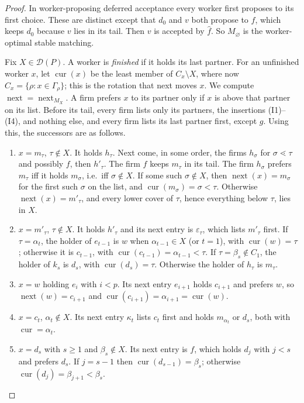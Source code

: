 \documentclass[11pt]{article}
\theoremstyle{definition}
\theoremstyle{remark}
\newcommand{\D}{\mathcal D}
\newcommand{\cur}{\operatorname{cur}}
\newcommand{\nxt}{\operatorname{next}}
\begin{document}
\begin{proof}
In worker-proposing deferred acceptance every worker first proposes to its first choice. These are distinct except that $d_0$ and $v$ both propose to $f$, which keeps $d_0$ because $v$ lies in its tail. Then $v$ is accepted by $\hat f$. So $M_\varnothing$ is the worker-optimal stable matching.

Fix $X\in\D(P)$. A worker is \emph{finished} if it holds its last partner. For an unfinished worker $x$, let $\cur(x)$ be the least member of $C_x\setminus X$, where now $C_x=\{\rho:x\in\Gamma_\rho\}$; this is the rotation that next moves $x$. We compute $\nxt=\nxt_{M_X}$. A firm prefers $x$ to its partner only if $x$ is above that partner on its list. Before its tail, every firm lists only its partners, the insertions (I1)--(I4), and nothing else, and every firm lists its last partner first, except $g$. Using this, the successors are as follows.
\begin{enumerate}[label=(\roman*)]
\item $x=m_\tau$, $\tau\notin X$. It holds $h_\tau$. Next come, in some order, the firms $h_\sigma$ for $\sigma\lessdot\tau$ and possibly $f$, then $h'_\tau$. The firm $f$ keeps $m_\tau$ in its tail. The firm $h_\sigma$ prefers $m_\tau$ iff it holds $m_\sigma$, i.e.\ iff $\sigma\notin X$. If some such $\sigma\notin X$, then $\nxt(x)=m_\sigma$ for the first such $\sigma$ on the list, and $\cur(m_\sigma)=\sigma<\tau$. Otherwise $\nxt(x)=m'_\tau$, and every lower cover of $\tau$, hence everything below $\tau$, lies in $X$.
\item $x=m'_\tau$, $\tau\notin X$. It holds $h'_\tau$ and its next entry is $\varepsilon_\tau$, which lists $m'_\tau$ first. If $\tau=\alpha_t$, the holder of $e_{t-1}$ is $w$ when $\alpha_{t-1}\in X$ (or $t=1$), with $\cur(w)=\tau$; otherwise it is $c_{t-1}$, with $\cur(c_{t-1})=\alpha_{t-1}<\tau$. If $\tau=\beta_s\notin C_1$, the holder of $k_s$ is $d_s$, with $\cur(d_s)=\tau$. Otherwise the holder of $h_\tau$ is $m_\tau$.
\item $x=w$ holding $e_i$ with $i<p$. Its next entry $e_{i+1}$ holds $c_{i+1}$ and prefers $w$, so $\nxt(w)=c_{i+1}$ and $\cur(c_{i+1})=\alpha_{i+1}=\cur(w)$.
\item $x=c_t$, $\alpha_t\notin X$. Its next entry $\kappa_t$ lists $c_t$ first and holds $m_{\alpha_t}$ or $d_s$, both with $\cur=\alpha_t$.
\item $x=d_s$ with $s\ge1$ and $\beta_s\notin X$. Its next entry is $f$, which holds $d_j$ with $j<s$ and prefers $d_s$. If $j=s-1$ then $\cur(d_{s-1})=\beta_s$; otherwise $\cur(d_j)=\beta_{j+1}<\beta_s$.

\end{enumerate}
\end{proof}
\end{document}
